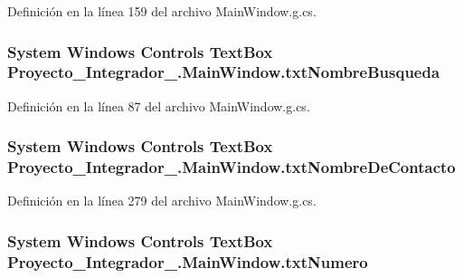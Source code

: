 Definición en la línea 159 del archivo Main\-Window.\-g.\-cs.

\hypertarget{class_proyecto___integrador__3_1_1_main_window_a8b7a97d30e0788fb2ff72eaee1d0ab88}{
\subsubsection[{txt\-Nombre\-Busqueda}]{\setlength{\rightskip}{0pt plus 5cm}System Windows Controls Text\-Box Proyecto\-\_\-\-Integrador\-\_.\-Main\-Window.\-txt\-Nombre\-Busqueda\hspace{0.3cm}{\ttfamily [package]}}}\label{class_proyecto___integrador__3_1_1_main_window_a8b7a97d30e0788fb2ff72eaee1d0ab88}


Definición en la línea 87 del archivo Main\-Window.\-g.\-cs.

\hypertarget{class_proyecto___integrador__3_1_1_main_window_afe7d51ab07d58ba85a31a58fce6f7d34}{
\subsubsection[{txt\-Nombre\-De\-Contacto}]{\setlength{\rightskip}{0pt plus 5cm}System Windows Controls Text\-Box Proyecto\-\_\-\-Integrador\-\_.\-Main\-Window.\-txt\-Nombre\-De\-Contacto\hspace{0.3cm}{\ttfamily [package]}}}\label{class_proyecto___integrador__3_1_1_main_window_afe7d51ab07d58ba85a31a58fce6f7d34}


Definición en la línea 279 del archivo Main\-Window.\-g.\-cs.

\hypertarget{class_proyecto___integrador__3_1_1_main_window_aa5f2bae20c9397b7c6ea3926afebd5ce}{
\subsubsection[{txt\-Numero}]{\setlength{\rightskip}{0pt plus 5cm}System Windows Controls Text\-Box Proyecto\-\_\-\-Integrador\-\_.\-Main\-Window.\-txt\-Numero\hspace{0.3cm}{\ttfamily [package]}}}\label{class_proyecto___integrador__3_1_1_main_window_aa5f2bae20c9397b7c6ea3926afebd5ce}


